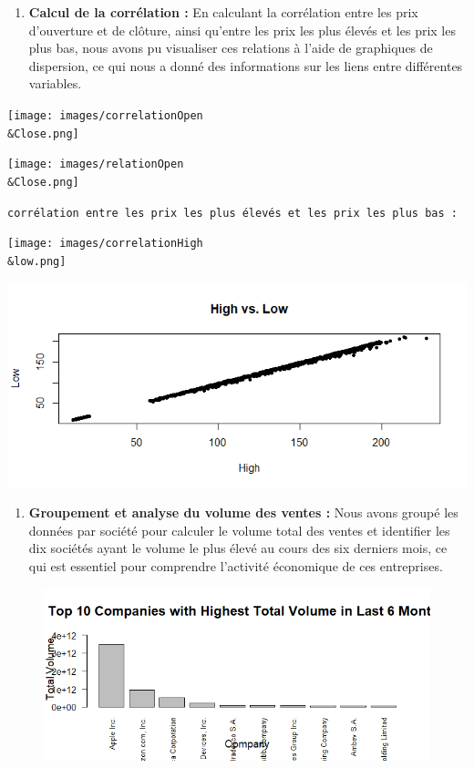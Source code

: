 \documentclass[
  letterpaper,
  DIV=11,
  numbers=noendperiod]{scrartcl}
\providecommand{\tightlist}{%
  \setlength{\itemsep}{0pt}\setlength{\parskip}{0pt}}\usepackage{longtable,booktabs,array}
\begin{document}
\begin{enumerate}
\def\labelenumi{\arabic{enumi}.}
\setcounter{enumi}{6}
\tightlist
\item
  \textbf{Calcul de la corrélation :} En calculant la corrélation entre
  les prix d'ouverture et de clôture, ainsi qu'entre les prix les plus
  élevés et les prix les plus bas, nous avons pu visualiser ces
  relations à l'aide de graphiques de dispersion, ce qui nous a donné
  des informations sur les liens entre différentes variables.
\end{enumerate}

\texttt{[image: images/correlationOpen\\\&Close.png]}

\texttt{[image: images/relationOpen\\\&Close.png]}

\texttt{corrélation\ entre\ les\ prix\ les\ plus\ élevés\ et\ les\ prix\ les\ plus\ bas\ :}

\texttt{[image: images/correlationHigh\\\&low.png]}

\includegraphics{images/HighvsLow.png}

\begin{enumerate}
\def\labelenumi{\arabic{enumi}.}
\setcounter{enumi}{7}
\tightlist
\item
  \textbf{Groupement et analyse du volume des ventes :} Nous avons
  groupé les données par société pour calculer le volume total des
  ventes et identifier les dix sociétés ayant le volume le plus élevé au
  cours des six derniers mois, ce qui est essentiel pour comprendre
  l'activité économique de ces entreprises.
\end{enumerate}

\begin{figure}

{\centering \includegraphics[width=5.5625in,height=\textheight]{images/top10Companies.png}

}

\end{figure}
\end{document}
